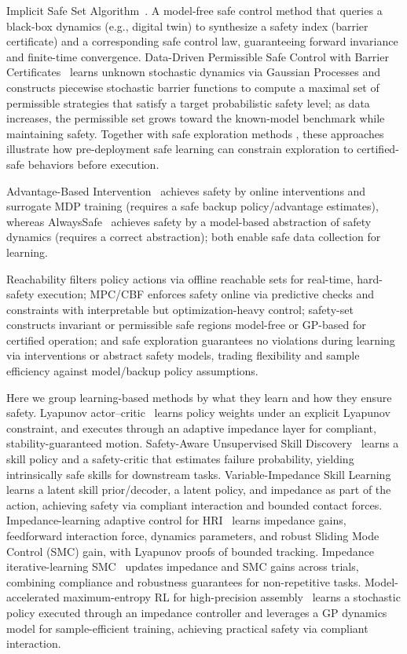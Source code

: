 \documentclass[Afour,sageh,times]{template/sagej}
\begin{document}
Implicit Safe Set Algorithm~\cite{zhao2024implicit}.  A model-free safe control method that queries a black-box dynamics (e.g., digital twin) to synthesize a safety index (barrier certificate) and a corresponding safe control law, guaranteeing forward invariance and finite-time convergence. 
Data-Driven Permissible Safe Control with Barrier Certificates~\cite{mazouz2024data} learns unknown stochastic dynamics via Gaussian Processes and constructs piecewise stochastic barrier functions to compute a maximal set of permissible strategies that satisfy a target probabilistic safety level; as data increases, the permissible set grows toward the known-model benchmark while maintaining safety. Together with safe exploration methods \cite{sootla2022saute,yang2021wcsac,lei2024langevin}, these approaches illustrate how pre-deployment safe learning can constrain exploration to certified-safe behaviors before execution.

Advantage-Based Intervention~\cite{wagener2021safe} achieves safety by online interventions and surrogate MDP training (requires a safe backup policy/advantage estimates), whereas AlwaysSafe~\cite{simao2021alwayssafe} achieves safety by a model-based abstraction of safety dynamics (requires a correct abstraction); both enable safe data collection for learning.

Reachability filters policy actions via offline reachable sets for real-time, hard-safety execution; MPC/CBF enforces safety online via predictive checks and constraints with interpretable but optimization-heavy control; safety-set constructs invariant or permissible safe regions model-free or GP-based for certified operation; and safe exploration guarantees no violations during learning via interventions or abstract safety models, trading flexibility and sample efficiency against model/backup policy assumptions.

Here we group learning-based methods by what they learn and how they ensure safety. Lyapunov actor–critic~\cite{16} learns policy weights under an explicit Lyapunov constraint, and executes through an adaptive impedance layer for compliant, stability-guaranteed motion. Safety-Aware Unsupervised Skill Discovery~\cite{22} learns a skill policy and a safety-critic that estimates failure probability, yielding intrinsically safe skills for downstream tasks. Variable-Impedance Skill Learning~\cite{23} learns a latent skill prior/decoder, a latent policy, and impedance as part of the action, achieving safety via compliant interaction and bounded contact forces. Impedance-learning adaptive control for HRI~\cite{9531394} learns impedance gains, feedforward interaction force, dynamics parameters, and robust Sliding Mode Control (SMC) gain, with Lyapunov proofs of bounded tracking. Impedance iterative-learning SMC~\cite{5} updates impedance and SMC gains across trials, combining compliance and robustness guarantees for non-repetitive tasks. Model-accelerated maximum-entropy RL for high-precision assembly~\cite{98} learns a stochastic policy executed through an impedance controller and leverages a GP dynamics model for sample-efficient training, achieving practical safety via compliant interaction.
\end{document}
